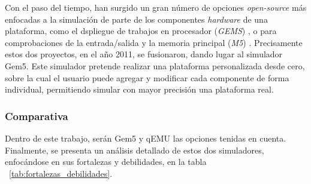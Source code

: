 Con el paso del tiempo, han surgido un gran número de opciones \textit{open-source} más enfocadas a la simulación de parte de los componentes \textit{hardware} de una plataforma, como el dspliegue de trabajos en procesador (\textit{GEMS}) \cite{PHILLIPS1979225}, o para comprobaciones de la entrada/salida y la memoria principal (\textit{M5}) \cite{10.1109/MM.2006.82}. Precisamente estos dos proyectos, en el año 2011, se fusionaron, dando lugar al simulador Gem5. Este simulador pretende realizar una plataforma personalizada desde cero, sobre la cual el usuario puede agregar y modificar cada componente de forma individual, permitiendo simular con mayor precisión una plataforma real. 

\subsubsection{Comparativa}

Dentro de este trabajo, serán Gem5 y qEMU las opciones tenidas en cuenta. Finalmente, se presenta un análisis detallado de estos dos simuladores, enfocándose en sus fortalezas y debilidades, en la tabla ~\ref{tab:fortalezas_debilidades}.

